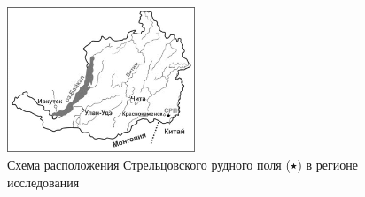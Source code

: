 \begin{figure}
  \begin{center}
    \includegraphics[width=0.5\textwidth]{authors/mandzhieva-fig-1.png}
  \end{center}
  \caption{Схема расположения Стрельцовского рудного поля ($\medblackstar$) в регионе исследования}
  \label{fig:mandzhieva-fig-1}
\end{figure}
